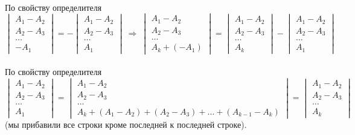 \documentclass[a4paper, 12pt]{article}
\begin{document}
    \\ По свойству определителя $\begin{vmatrix}A_1 - A_2 \\ A_2 - A_3 \\ \dots \\ -A_1\end{vmatrix} = -\begin{vmatrix}A_1 - A_2 \\ A_2 - A_3 \\ \dots \\ A_1\end{vmatrix} \ \Rightarrow \ \begin{vmatrix}A_1 - A_2 \\ A_2 - A_3 \\ \dots \\ A_k + (-A_1)\end{vmatrix} = \begin{vmatrix}A_1 - A_2 \\ A_2 - A_3 \\ \dots \\ A_k\end{vmatrix} - \begin{vmatrix}A_1 - A_2 \\ A_2 - A_3 \\ \dots \\ A_1\end{vmatrix}$
    \\
    \\ По свойству определителя $\begin{vmatrix}A_1 - A_2 \\ A_2 - A_3 \\ \dots \\ A_1\end{vmatrix} = \begin{vmatrix}A_1 - A_2 \\ A_2 - A_3 \\ \dots \\ A_k + (A_1 - A_2) + (A_2 - A_3) + ... + (A_{k - 1} - A_k)\end{vmatrix} = \begin{vmatrix}A_1 - A_2 \\ A_2 - A_3 \\ \dots \\ A_k\end{vmatrix}$ (мы прибавили все строки кроме последней к последней строке).
    \\
\end{document}
